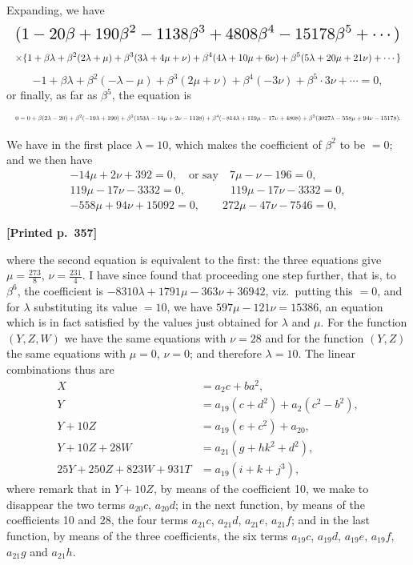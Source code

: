 \documentclass[11pt]{article}
\begin{document}
Expanding, we have
\[
\resizebox{\textwidth}{!}{$\displaystyle
(1-20\beta+190\beta^{2}-1138\beta^{3}+4808\beta^{4}-15178\beta^{5}+\cdots)
$}
\]
\[
\resizebox{\textwidth}{!}{$\displaystyle
\times\{1+\beta\lambda+\beta^{2}(2\lambda+\mu)+\beta^{3}(3\lambda+4\mu+\nu)+\beta^{4}(4\lambda+10\mu+6\nu)+\beta^{5}(5\lambda+20\mu+21\nu)+\cdots\}
$}
\]
\[
-1+\beta\lambda+\beta^{2}(-\lambda-\mu)+\beta^{3}(2\mu+\nu)+\beta^{4}(-3\nu)+\beta^{5}\cdot 3\nu+\cdots=0,
\]
or finally, as far as $\beta^{5}$, the equation is
\[
\resizebox{\textwidth}{!}{$\displaystyle
0=0+\beta(2\lambda-20)+\beta^{2}(-19\lambda+190)+\beta^{3}(153\lambda-14\mu+2\nu-1138)
+\beta^{4}(-814\lambda+119\mu-17\nu+4808)+\beta^{5}(3027\lambda-558\mu+94\nu-15178).
$}
\]

We have in the first place $\lambda=10$, which makes the coefficient of $\beta^{2}$ to be $=0$; and we then have
\[
\begin{array}{l}
-14\mu+2\nu+392=0,\quad \text{or say}\quad 7\mu-\nu-196=0,\\
119\mu-17\nu-3332=0,\qquad\qquad 119\mu-17\nu-3332=0,\\
-558\mu+94\nu+15092=0,\qquad 272\mu-47\nu-7546=0,
\end{array}
\]

\medskip
\noindent\textbf{[Printed p.~357]}\hfill

where the second equation is equivalent to the first: the three equations give $\mu=\tfrac{273}{8}$, $\nu=\tfrac{231}{4}$. I have since found that proceeding one step further, that is, to $\beta^{6}$, the coefficient is $-8310\lambda+1791\mu-363\nu+36942$, viz.\ putting this $=0$, and for $\lambda$ substituting its value $=10$, we have $597\mu-121\nu=15386$, an equation which is in fact satisfied by the values just obtained for $\lambda$ and $\mu$. For the function $(Y,Z,W)$ we have the same equations with $\nu=28$ and for the function $(Y,Z)$ the same equations with $\mu=0$, $\nu=0$; and therefore $\lambda=10$. The linear combinations thus are
\begin{align*}
X &= a_{2}c+b a^{2},\\
Y &= a_{19}(c+d^{2})+a_{2}(c^{2}-b^{2}),\\
Y+10Z &= a_{19}(e+c^{2})+a_{20},\\
Y+10Z+28W &= a_{21}(g+hk^{2}+d^{2}),\\
25Y+250Z+823W+931T &= a_{19}(i+k+j^{3}),
\end{align*}
where remark that in $Y+10Z$, by means of the coefficient 10, we make to disappear the two terms $a_{20}c$, $a_{20}d$; in the next function, by means of the coefficients 10 and 28, the four terms $a_{21}c$, $a_{21}d$, $a_{21}e$, $a_{21}f$; and in the last function, by means of the three coefficients, the six terms $a_{19}c$, $a_{19}d$, $a_{19}e$, $a_{19}f$, $a_{21}g$ and $a_{21}h$.
\end{document}
